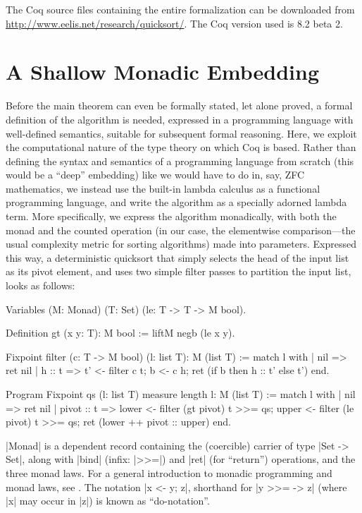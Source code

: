 \documentclass[runningheads]{llncs}
\begin{document}
The Coq source files containing the entire formalization can be downloaded from \url{http://www.eelis.net/research/quicksort/}. The Coq version used is 8.2 beta 2.

\section{A Shallow Monadic Embedding}
\label{embed}

Before the main theorem can even be formally stated, let alone proved, a formal definition of the algorithm is needed, expressed in a programming language with well-defined semantics, suitable for subsequent formal reasoning. Here, we exploit the computational nature of the type theory on which Coq is based. Rather than defining the syntax and semantics of a programming language from scratch (this would be a ``deep'' embedding) like we would have to do in, say, ZFC mathematics, we instead use the built-in lambda calculus as a functional programming language, and write the algorithm as a specially adorned lambda term. More specifically, we express the algorithm monadically, with both the monad and the counted operation (in our case, the elementwise comparison---the usual complexity metric for sorting algorithms) made into parameters. Expressed this way, a deterministic quicksort that simply selects the head of the input list as its pivot element, and uses two simple filter passes to partition the input list, looks as follows:

\begin{code}
  Variables (M: Monad) (T: Set) (le: T -> T -> M bool).

  Definition gt (x y: T): M bool := liftM negb (le x y).

  Fixpoint filter (c: T -> M bool) (l: list T): M (list T) :=
    match l with
    | nil => ret nil
    | h :: t =>
      t' <- filter c t;
      b <- c h;
      ret (if b then h :: t' else t')
    end.

  Program Fixpoint qs (l: list T) {measure length l}: M (list T) :=
    match l with
    | nil => ret nil
    | pivot :: t =>
        lower <- filter (gt pivot) t >>= qs;
        upper <- filter (le pivot) t >>= qs;
        ret (lower ++ pivot :: upper)
    end.
\end{code}
|Monad| is a dependent record containing the (coercible) carrier of type |Set -> Set|, along with |bind| (infix: |>>=|) and |ret| (for ``return'') operations, and the three monad laws. For a general introduction to monadic programming and monad laws, see \cite{wadler93monads}. The notation |x <- y; z|, shorthand for |y >>= \x -> z| (where |x| may occur in |z|) is known as ``do-notation''.
\end{document}

